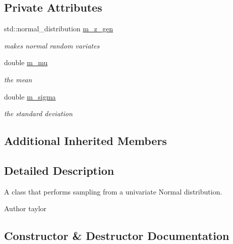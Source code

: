 \subsection*{Private Attributes}
\begin{DoxyCompactItemize}
\item 
std\+::normal\+\_\+distribution \hyperlink{classUnivNormSampler_aa1a83f0dfcd5eb682ff09fcb6c2918b3}{m\+\_\+z\+\_\+gen}\hypertarget{classUnivNormSampler_aa1a83f0dfcd5eb682ff09fcb6c2918b3}{}\label{classUnivNormSampler_aa1a83f0dfcd5eb682ff09fcb6c2918b3}

\begin{DoxyCompactList}\small\item\em makes normal random variates \end{DoxyCompactList}\item 
double \hyperlink{classUnivNormSampler_a67db5f199eeb098ed65d461989782d1f}{m\+\_\+mu}\hypertarget{classUnivNormSampler_a67db5f199eeb098ed65d461989782d1f}{}\label{classUnivNormSampler_a67db5f199eeb098ed65d461989782d1f}

\begin{DoxyCompactList}\small\item\em the mean \end{DoxyCompactList}\item 
double \hyperlink{classUnivNormSampler_af1a2e711a4a5fded09136fd9cd161f90}{m\+\_\+sigma}\hypertarget{classUnivNormSampler_af1a2e711a4a5fded09136fd9cd161f90}{}\label{classUnivNormSampler_af1a2e711a4a5fded09136fd9cd161f90}

\begin{DoxyCompactList}\small\item\em the standard deviation \end{DoxyCompactList}\end{DoxyCompactItemize}
\subsection*{Additional Inherited Members}


\subsection{Detailed Description}
A class that performs sampling from a univariate Normal distribution. 

\begin{DoxyAuthor}{Author}
taylor 
\end{DoxyAuthor}


\subsection{Constructor \& Destructor Documentation}
